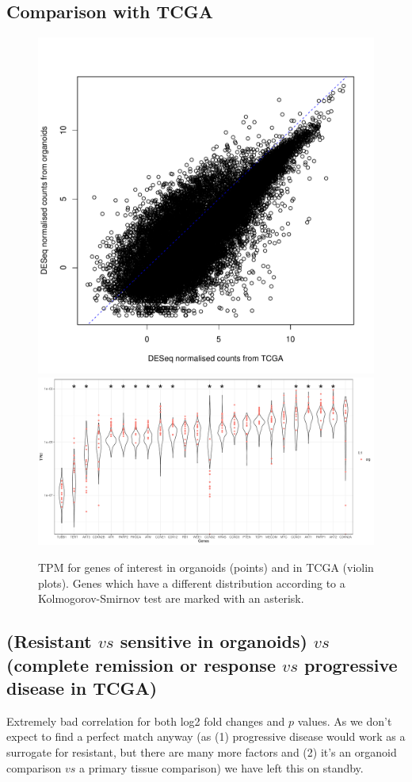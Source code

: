\documentclass{article}
\begin{document}
\clearpage
\subsection{Comparison with TCGA}

\begin{figure}[h]
\centering
\includegraphics[width=.42\textwidth]{../../RNASeq_DE_resistant_sensitive/figures/Sensitive_resistant_figures/colmeans_deseqcounts_correlation_tcga_org.pdf}
\includegraphics[width=\textwidth]{../../RNASeq_DE_resistant_sensitive/figures/Sensitive_resistant_figures/TPM_correlation_tcga_org_selected_genes.pdf}
\caption{TPM for genes of interest in organoids (points) and in TCGA (violin plots). Genes which have a different distribution according to a Kolmogorov-Smirnov test are marked with an asterisk.}
\end{figure}

\clearpage

\subsection{(Resistant $vs$ sensitive in organoids) $vs$ (complete remission or response $vs$ progressive disease in TCGA) }

Extremely bad correlation for both log2 fold changes and $p$ values. As we don't expect to find a perfect match anyway (as (1) progressive disease would work as a surrogate for resistant, but there are many more factors and (2) it's an organoid comparison $vs$ a primary tissue comparison) we have left this on standby.
\end{document}
